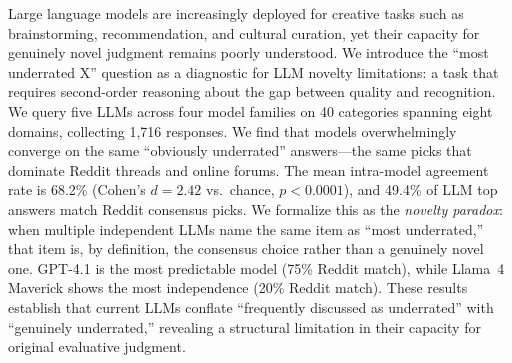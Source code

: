 Large language models are increasingly deployed for creative tasks such as brainstorming, recommendation, and cultural curation, yet their capacity for genuinely novel judgment remains poorly understood. We introduce the ``most underrated X'' question as a diagnostic for LLM novelty limitations: a task that requires second-order reasoning about the gap between quality and recognition. We query five LLMs across four model families on 40 categories spanning eight domains, collecting 1,716 responses. We find that models overwhelmingly converge on the same ``obviously underrated'' answers---the same picks that dominate Reddit threads and online forums. The mean intra-model agreement rate is 68.2\% (Cohen's $d = 2.42$ vs.\ chance, $p < 0.0001$), and 49.4\% of LLM top answers match Reddit consensus picks. We formalize this as the \textit{novelty paradox}: when multiple independent LLMs name the same item as ``most underrated,'' that item is, by definition, the consensus choice rather than a genuinely novel one. GPT-4.1 is the most predictable model (75\% Reddit match), while Llama~4 Maverick shows the most independence (20\% Reddit match). These results establish that current LLMs conflate ``frequently discussed as underrated'' with ``genuinely underrated,'' revealing a structural limitation in their capacity for original evaluative judgment.
